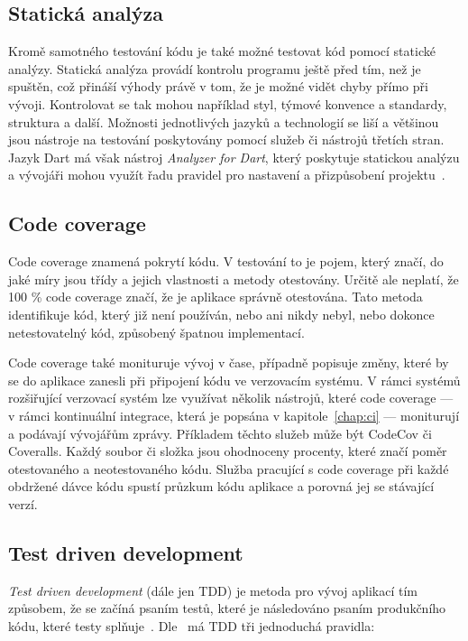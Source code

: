 \subsection{Statická analýza}

Kromě samotného testování kódu je také možné testovat kód pomocí statické
analýzy.
Statická analýza provádí kontrolu programu ještě před tím,
než je spuštěn,
což přináší výhody právě v tom,
že je možné vidět chyby přímo při vývoji.
Kontrolovat se tak mohou například styl, týmové konvence a standardy, struktura
a další.
Možnosti jednotlivých jazyků a technologií se liší a většinou jsou nástroje
na testování poskytovány pomocí služeb či nástrojů třetích stran.
Jazyk Dart má však nástroj \emph{Analyzer for Dart},
který poskytuje statickou analýzu
a vývojáři mohou využít řadu pravidel pro nastavení
a přizpůsobení projektu~\cite{analyzer}.

\subsection{Code coverage}

Code coverage znamená pokrytí kódu.
V testování to je pojem,
který značí,
do jaké míry jsou třídy a jejich vlastnosti a metody otestovány.
Určitě ale neplatí,
že 100 \% code coverage značí,
že je aplikace správně otestována.
Tato metoda identifikuje kód,
který již není používán,
nebo ani nikdy nebyl,
nebo dokonce netestovatelný kód,
způsobený špatnou implementací.~\cite{code_coverage}

Code coverage také monituruje vývoj v čase,
případně popisuje změny,
které by se do aplikace zanesli při připojení kódu ve verzovacím systému.
V rámci systémů rozšiřující verzovací systém lze využívat několik nástrojů,
které code coverage
--- v rámci kontinuální integrace, která je popsána v kapitole~\ref{chap:ci} ---
moniturují a podávají vývojářům zprávy.
Příkladem těchto služeb může být CodeCov či Coveralls.
Každý soubor či složka jsou ohodnoceny procenty,
které značí poměr otestovaného a neotestovaného kódu.
Služba pracující s code coverage při každé obdržené dávce kódu spustí
průzkum kódu aplikace a porovná jej se stávající verzí.~\cite{code_coverage}

\subsection{Test driven development}
\label{sec:tdd}

\emph{Test driven development} (dále jen TDD) je metoda pro vývoj aplikací tím
způsobem,
že se začíná psaním testů,
které je následováno psaním produkčního kódu,
které testy splňuje~\cite{tdd}.
Dle~\cite{tdd} má TDD tři jednoduchá pravidla:

